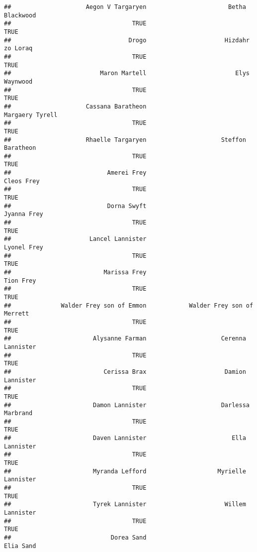 \documentclass[
]{book}
\begin{document}
\begin{verbatim}
##                     Aegon V Targaryen                       Betha Blackwood 
##                                  TRUE                                  TRUE 
##                                 Drogo                      Hizdahr zo Loraq 
##                                  TRUE                                  TRUE 
##                         Maron Martell                         Elys Waynwood 
##                                  TRUE                                  TRUE 
##                     Cassana Baratheon                       Margaery Tyrell 
##                                  TRUE                                  TRUE 
##                     Rhaelle Targaryen                     Steffon Baratheon 
##                                  TRUE                                  TRUE 
##                           Amerei Frey                            Cleos Frey 
##                                  TRUE                                  TRUE 
##                           Dorna Swyft                           Jyanna Frey 
##                                  TRUE                                  TRUE 
##                      Lancel Lannister                           Lyonel Frey 
##                                  TRUE                                  TRUE 
##                          Marissa Frey                             Tion Frey 
##                                  TRUE                                  TRUE 
##              Walder Frey son of Emmon            Walder Frey son of Merrett 
##                                  TRUE                                  TRUE 
##                       Alysanne Farman                     Cerenna Lannister 
##                                  TRUE                                  TRUE 
##                          Cerissa Brax                      Damion Lannister 
##                                  TRUE                                  TRUE 
##                       Damon Lannister                     Darlessa Marbrand 
##                                  TRUE                                  TRUE 
##                       Daven Lannister                        Ella Lannister 
##                                  TRUE                                  TRUE 
##                       Myranda Lefford                    Myrielle Lannister 
##                                  TRUE                                  TRUE 
##                       Tyrek Lannister                      Willem Lannister 
##                                  TRUE                                  TRUE 
##                            Dorea Sand                             Elia Sand 

\end{verbatim}
\end{document}
